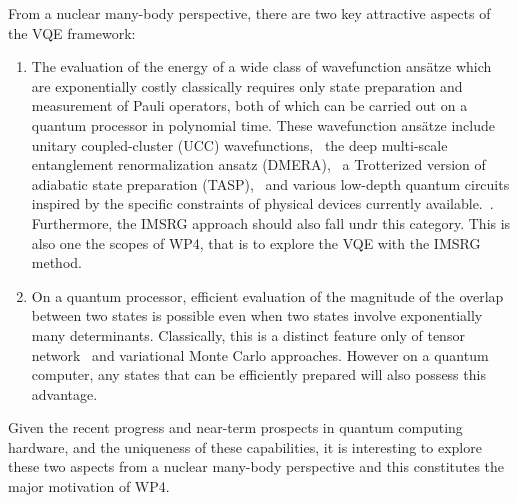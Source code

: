 \documentclass[10pt]{article}
\begin{document}
From a nuclear many-body perspective, there are 
two key attractive
aspects of the VQE framework: 
\begin{enumerate}
\item The evaluation of the energy of a wide class of wavefunction ans{\"a}tze which are
  exponentially costly classically  requires only state preparation and measurement of Pauli operators, both of which can be carried out on a quantum processor in polynomial time. These
wavefunction ans{\"a}tze include unitary coupled-cluster 
(UCC) wavefunctions,~\cite{evangelista2011alternative, peruzzo2014variational} the deep multi-scale entanglement renormalization ansatz (DMERA),~\cite{kim2017robust} a Trotterized version of adiabatic state preparation (TASP),~\cite{wecker2015progress}  and various low-depth quantum circuits inspired by the specific constraints of physical devices currently available.~\cite{kandala2017hardware}. Furthermore, the IMSRG approach should also fall undr this category. This is also one the scopes of WP4, that is to explore the VQE with the IMSRG method. 

\item On a quantum processor, efficient evaluation of the magnitude of the overlap between two
states is possible even when two states involve exponentially many determinants. Classically, this is a distinct feature only of tensor network~\cite{stoudenmire2012studying} and variational Monte  Carlo \cite{Cyrus1998} approaches.
However on a quantum computer, any states that can be efficiently prepared will also possess this advantage.
\end{enumerate}

Given the recent progress and near-term prospects in quantum computing
hardware, and the uniqueness of these capabilities, it is interesting to explore these two aspects from a nuclear many-body  perspective and this constitutes the major motivation of WP4.
\end{document}
